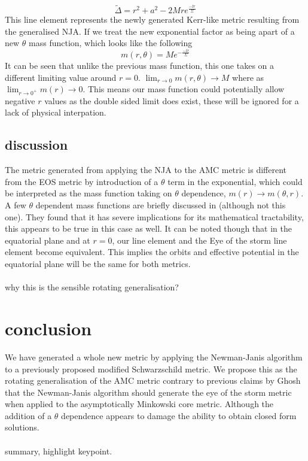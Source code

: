 \documentclass[12pt]{iopart}
\begin{document}
 \begin{equation} 
 \tilde{\Delta} = r^2+a^2-2Mre^{\frac{-lr}{\Sigma}}
 \end{equation}
This line element represents the newly generated Kerr-like metric resulting from the generalised NJA. If we treat the new exponential factor as being apart of a new $\theta$ mass function, which looks like the following
\begin{equation}
m(r,\theta) = Me^{-\frac{-lr}{\Sigma}}
\end{equation}
It can be seen that unlike the previous mass function, this one takes on a different limiting value around $r=0$. $\lim_{r\to 0} m(r,\theta) \rightarrow M$ where as $\lim_{r\to 0^+} m(r) \rightarrow 0$. This means our mass function could potentially allow negative $r$ values as the double sided limit does exist, these will be ignored for a lack of physical interpation.
\subsection{discussion}
The metric generated from applying the NJA to the AMC metric is different from the EOS metric by introduction of a $\theta$ term in the exponential, which could be interpreted as the mass function taking on $\theta$ dependence, $m(r) \rightarrow m(\theta,r)$. A few $\theta$ dependent mass functions are briefly discussed in \cite{Simpson:2021dyo} (although not this one). They found that it has severe implications for its mathematical tractability, this appears to be true in this case as well. It can be noted though that in the equatorial plane and at $r=0$, our line element and the Eye of the storm line element become equivalent. This implies the orbits and effective potential in the equatorial plane will be the same for both metrics.
\\
\\
why this is the sensible rotating generalisation?
\section{conclusion}
We have generated a whole new metric by applying the Newman-Janis algorithm to a previously proposed modified Schwarzschild metric. We propose this as the rotating generalisation of the AMC metric contrary to previous claims by Ghosh that the Newman-Janis algorithm should generate the eye of the storm metric when applied to the asymptotically Minkowski core metric. Although the addition of a $\theta$ dependence appears to damage the ability to obtain closed form solutions.
\\
\\
summary, highlight keypoint.
\\
\\
\end{document}
